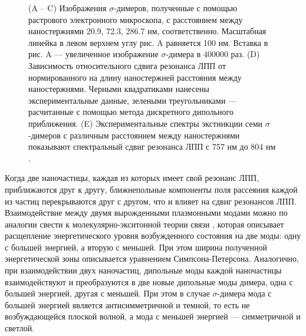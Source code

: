 \begin{figure}[t]
\caption{(A -- C) Изображения $ \sigma $-димеров, полученные с помощью растрового электронного микроскопа, с расстоянием между наностержнями 20.9, 72.3, 286.7 нм, соответственно. Масштабная линейка в левом верхнем углу рис. A равняется 100 нм. Вставка в рис. A --- увеличенное изображение $ \sigma $-димера в 400000 раз. (D) Зависимость относительного сдвига резонанса ЛПП от нормированного на длину наностержней расстояния между наностержнями. Черными квадратиками нанесены экспериментальные данные, зелеными треугольниками --- расчитанные с помощью метода дискретного дипольного приближения. (E) Экспериментальные спектры экстинкции семи $ \sigma $-димеров с различным расстоянием между наностержнями показывают спектральный сдвиг резонанса ЛПП с 757 нм до 804 нм \cite{nanorods2}.}
\label{img:PR_nanorods}
\end{figure}

Когда две наночастицы, каждая из которых имеет свой резонанс ЛПП, приближаются друг к другу, ближнепольные компоненты поля рассеяния каждой из частиц перекрываются друг с другом, что и влияет на сдвиг резонансов ЛПП. Взаимодействие между двумя вырожденными плазмонными модами можно по аналогии свести к молекулярно-экситонной теории связи \cite{MECT}, которая описывает расщепление энергетического уровня возбужденного состояния на две моды: одну с большей энергией, а вторую с меньшей. При этом ширина полученной энергетической зоны описывается уравнением Симпсона-Петерсона. Аналогично, при взаимодействии двух наночастиц, дипольные моды каждой наночастицы взаимодействуют и преобразуются в две новые дипольные моды димера, одна с большей энергией, другая с меньшей. При этом в случае $ \sigma $-димера мода с большей энергией является антисимметричной и темной, то есть не возбуждающейся плоской волной, а мода с меньшей энергией --- симметричной и светлой.

